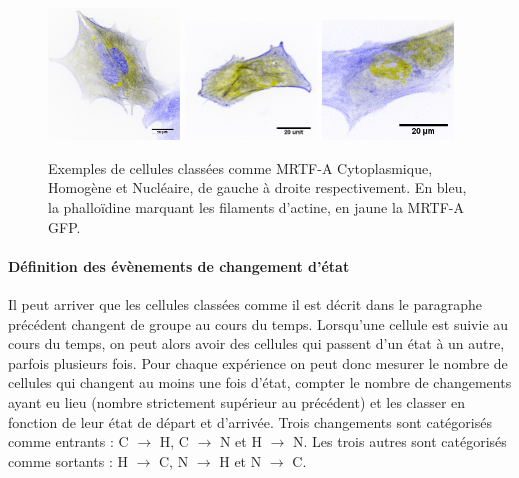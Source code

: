  \begin{figure}
  \includegraphics[width=3.5cm]{Figures/Exemple_C_invert.png} 
 \includegraphics[width=3.5cm]{Figures/Exemple_H_invert.png} 
 \includegraphics[width=3.5cm]{Figures/Exemple_N_2_invert.png} 
 \caption{Exemples de cellules classées comme MRTF-A Cytoplasmique, Homogène et Nucléaire, de gauche à droite respectivement. En bleu, la phalloïdine marquant les filaments d'actine, en jaune la MRTF-A GFP.\label{Exemples_CHN}}

 \end{figure}
 
 \paragraph{Définition des évènements de changement d'état}
 
 Il peut arriver que les cellules classées comme il est décrit dans le paragraphe précédent changent de groupe au cours du temps. 
 Lorsqu'une cellule est suivie au cours du temps, on peut alors avoir des cellules qui passent d'un état à un autre, parfois plusieurs fois. 
 Pour chaque expérience on peut donc mesurer le nombre de cellules qui changent au moins une fois d'état, compter le nombre de changements ayant eu lieu (nombre strictement supérieur au précédent) et les classer en fonction de leur état de départ et d'arrivée. 
 Trois changements sont catégorisés comme \og entrants \fg : C $\rightarrow$ H, C $\rightarrow$ N et H $\rightarrow$ N. 
 Les trois autres sont catégorisés comme \og sortants \fg  : H $\rightarrow$ C, N $\rightarrow$ H et N $\rightarrow$ C. 
 
